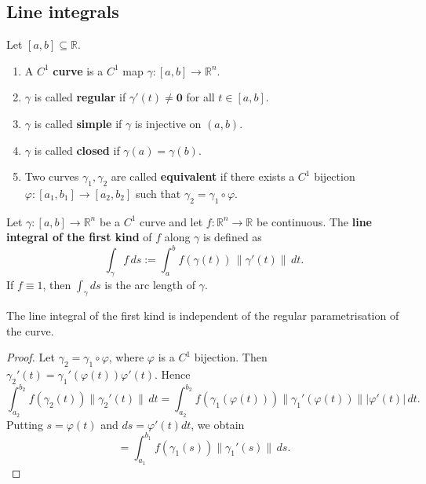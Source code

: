 \subsection{Line integrals}

\begin{definition}\label{def:curve_parameterization}
Let $[a, b] \subseteq \mathbb{R}$.
\begin{enumerate}[label=(\roman*)]
    \item A $C^1$ \textbf{curve} is a $C^1$ map $\gamma: [a, b] \to \mathbb{R}^n$.
    \item $\gamma$ is called \textbf{regular} if $\gamma'(t) \neq \mathbf{0}$ for all $t \in [a, b]$.
    \item $\gamma$ is called \textbf{simple} if $\gamma$ is injective on $(a, b)$.
    \item $\gamma$ is called \textbf{closed} if $\gamma(a) = \gamma(b)$.
    \item Two curves $\gamma_1, \gamma_2$ are called \textbf{equivalent} if there exists a $C^1$ bijection $\varphi: [a_1, b_1] \to [a_2, b_2]$ such that $\gamma_2 = \gamma_1 \circ \varphi$.
\end{enumerate}
\end{definition}

\begin{definition}\label{def:line_integral_first_kind}
Let $\gamma: [a, b] \to \mathbb{R}^n$ be a $C^1$ curve and let $f: \mathbb{R}^n \to \mathbb{R}$ be continuous. The \textbf{line integral of the first kind} of $f$ along $\gamma$ is defined as
\[
\int_\gamma f \, ds := \int_a^b f(\gamma(t)) \, \|\gamma'(t)\| \, dt.
\]
If $f \equiv 1$, then $\int_\gamma ds$ is the arc length of $\gamma$.
\end{definition}

\begin{proposition}\label{prop:line_integral_first_kind_invariance}
The line integral of the first kind is independent of the regular parametrisation of the curve.
\end{proposition}

\begin{proof}
Let $\gamma_2 = \gamma_1 \circ \varphi$, where $\varphi$ is a $C^1$ bijection. Then $\gamma_2'(t) = \gamma_1'(\varphi(t)) \varphi'(t)$. Hence
\[
\int_{a_2}^{b_2} f(\gamma_2(t)) \|\gamma_2'(t)\| \, dt = \int_{a_2}^{b_2} f(\gamma_1(\varphi(t))) \|\gamma_1'(\varphi(t))\| |\varphi'(t)| \, dt.
\]
Putting $s = \varphi(t)$ and $ds = \varphi'(t) dt$, we obtain
\[
= \int_{a_1}^{b_1} f(\gamma_1(s)) \|\gamma_1'(s)\| \, ds.
\]
\end{proof}

